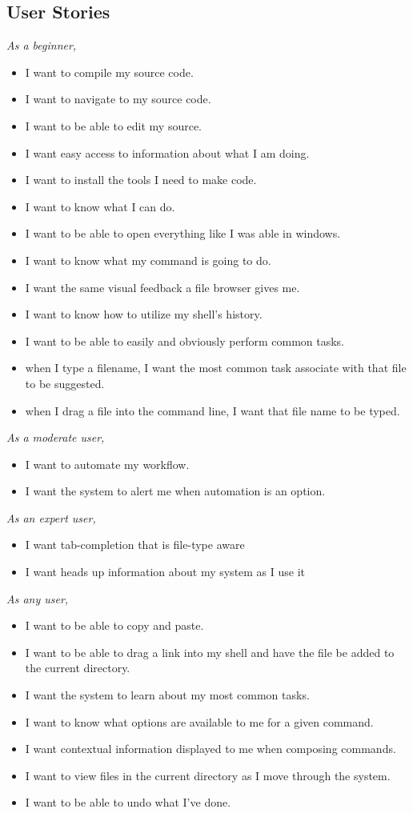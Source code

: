 \subsection{User Stories}
\emph{As a beginner, }
\begin{itemize}
  \item I want to compile my source code.
  \item I want to navigate to my source code.
  \item I want to be able to edit my source.
  \item I want easy access to information about what I am doing.
  \item I want to install the tools I need to make code.
  \item I want to know what I can do.
  \item I want to be able to open everything like I was able in windows.
  \item I want to know what my command is going to do.
  \item I want the same visual feedback a file browser gives me.
  \item I want to know how to utilize my shell’s history.
  \item I want to be able to easily and obviously perform common tasks.
  \item when I type a filename, I want the most common task associate with that file to be suggested.
  \item when I drag a file into the command line, I want that file name to be typed.
\end{itemize}

\emph{As a moderate user, }
\begin{itemize}
  \item I want to automate my workflow.
  \item I want the system to alert me when automation is an option.
\end{itemize}

\emph{As an expert user, }
\begin{itemize}
  \item I want tab-completion that is file-type aware
  \item I want heads up information about my system as I use it
\end{itemize}

\emph{As any user, }
\begin{itemize}
  \item I want to be able to copy and paste.
  \item I want to be able to drag a link into my shell and have the file be added to the current directory.
  \item I want the system to learn about my most common tasks.
  \item I want to know what options are available to me for a given command.
  \item I want contextual information displayed to me when composing commands.
  \item I want to view files in the current directory as I move through the system.
  \item I want to be able to undo what I’ve done.
\end{itemize}

